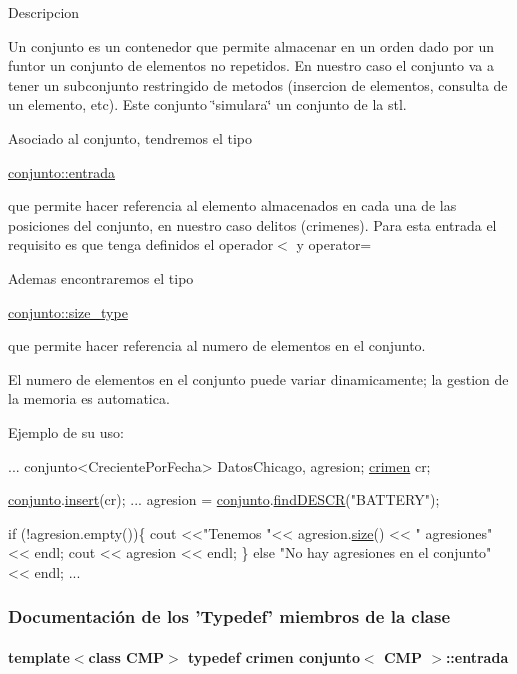 Descripcion

Un conjunto es un contenedor que permite almacenar en un orden dado por un funtor un conjunto de elementos no repetidos. En nuestro caso el conjunto va a tener un subconjunto restringido de metodos (insercion de elementos, consulta de un elemento, etc). Este conjunto \char`\"{}simulara\char`\"{} un conjunto de la stl.

Asociado al conjunto, tendremos el tipo
\begin{DoxyCode}
\hyperlink{classcrimen}{conjunto::entrada} 
\end{DoxyCode}
 que permite hacer referencia al elemento almacenados en cada una de las posiciones del conjunto, en nuestro caso delitos (crimenes). Para esta entrada el requisito es que tenga definidos el operador$<$ y operator=

Ademas encontraremos el tipo
\begin{DoxyCode}
\hyperlink{classconjunto_a0cc9902da62790ec2a6d59f4559c2df5}{conjunto::size\_type} 
\end{DoxyCode}
 que permite hacer referencia al numero de elementos en el conjunto.

El numero de elementos en el conjunto puede variar dinamicamente; la gestion de la memoria es automatica.

Ejemplo de su uso\-: 
\begin{DoxyCode}
...
conjunto<CrecientePorFecha> DatosChicago, agresion;
\hyperlink{classcrimen}{crimen} cr;

\hyperlink{classconjunto}{conjunto}.\hyperlink{classconjunto_a61c22092268cc91439b93a2fd96e4173}{insert}(cr);
...
agresion = \hyperlink{classconjunto}{conjunto}.\hyperlink{classconjunto_a52247b879aa00d67b660a3f1d72dc673}{findDESCR}(\textcolor{stringliteral}{"BATTERY"});

\textcolor{keywordflow}{if} (!agresion.empty())\{
 cout <<\textcolor{stringliteral}{"Tenemos "}<< agresion.\hyperlink{classconjunto_aa52964752a0e77c26f720f53e64ce818}{size}() << \textcolor{stringliteral}{" agresiones"} << endl;
 cout << agresion << endl;
\} \textcolor{keywordflow}{else} \textcolor{stringliteral}{"No hay agresiones en el conjunto"} << endl;
...
\end{DoxyCode}
 

\subsubsection{Documentación de los 'Typedef' miembros de la clase}
\hypertarget{classconjunto_a7630ace7cb17bcec07daf5804f1a0780}{
\paragraph[{entrada}]{\setlength{\rightskip}{0pt plus 5cm}template$<$class C\-M\-P$>$ typedef {\bf crimen} {\bf conjunto}$<$ C\-M\-P $>$\-::{\bf entrada}}}\label{classconjunto_a7630ace7cb17bcec07daf5804f1a0780}


